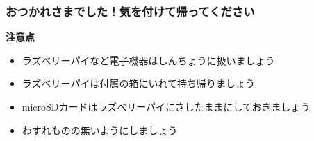 \documentclass[dvipdfmx]{beamer}
\begin{document}
\begin{frame}[fragile]
	\frametitle{おつかれさまでした！気を付けて帰ってください~~~}
     \large\textbf{注意点}
        \begin{itemize}
          \item ラズベリーパイなど電子機器はしんちょうに扱いましょう
          \bigskip
          \item ラズベリーパイは付属の箱にいれて持ち帰りましょう
          \bigskip
          \item microSDカードはラズベリーパイにさしたままにしておきましょう
          \bigskip
          \item わすれものの無いようにしましょう
        \end{itemize}
\end{frame}
\end{document}
